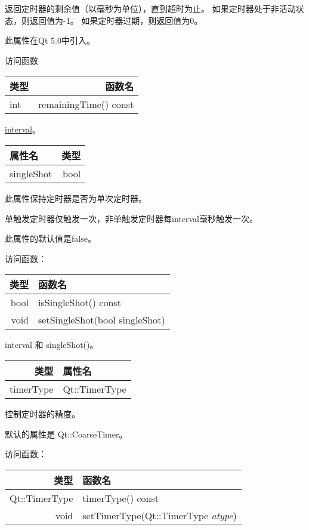 返回定时器的剩余值（以毫秒为单位），直到超时为止。 如果定时器处于非活动状态，则返回值为-1。 如果定时器过期，则返回值为0。

此属性在Qt 5.0中引入。

访问函数

\begin{tabular}{|l|r|}
\hline
类型 & 函数名 \\ 
\hline
int	& remainingTime() const \\
\hline
\end{tabular}


\begin{seeAlso}
\href{https://github.com/JackLovel/QtDocumentCN/blob/master/Src/T/QTimer/qtimer.html#interval-prop}{interval}。
\end{seeAlso}


\begin{tabular}{|l|r|}
\hline
属性名 & 类型 \\ 
\hline
singleShot &	bool \\
\hline
\end{tabular}


此属性保持定时器是否为单次定时器。

单触发定时器仅触发一次，非单触发定时器每interval毫秒触发一次。

此属性的默认值是false。

访问函数：

\begin{tabular}{|r|l|}
\hline
类型 & 	函数名 \\ 
\hline
bool &	isSingleShot() const \\ 
\hline
void	 & setSingleShot(bool singleShot) \\
\hline
\end{tabular}


\begin{seeAlso}
interval 和 singleShot()。
\end{seeAlso}

\begin{tabular}{|r|l|}
\hline
类型	 & 属性名 \\ 
\hline
timerType	 & Qt::TimerType \\ 
\hline
\end{tabular}

控制定时器的精度。

默认的属性是 Qt::CoarseTimer。

访问函数：

\begin{tabular}{|r|l|}
\hline
类型	 & 函数名 \\ 
\hline
Qt::TimerType & 	timerType() const \\ 
\hline
void	 & setTimerType(Qt::TimerType \emph{atype}) \\ 
\hline
\end{tabular}

